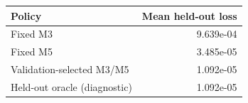 \begin{tabular}{lr}
\toprule
Policy & Mean held-out loss \\
\midrule
Fixed M3 & 9.639e-04 \\
Fixed M5 & 3.485e-05 \\
Validation-selected M3/M5 & 1.092e-05 \\
Held-out oracle (diagnostic) & 1.092e-05 \\
\bottomrule
\end{tabular}
